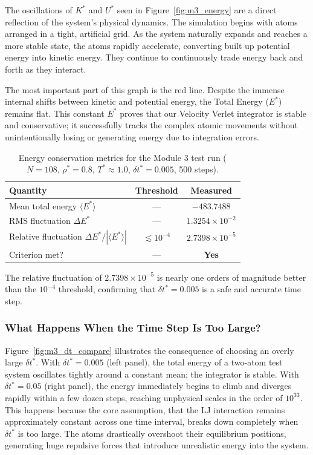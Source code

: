 The oscillations of $K^*$ and $U^*$ seen in Figure~\ref{fig:m3_energy} are a direct reflection of the system's physical dynamics. The simulation begins with atoms arranged in a tight, artificial grid. As the system naturally expands and reaches a more stable state, the atoms rapidly accelerate, converting built up potential energy into kinetic energy. They continue to continuously trade energy back and forth as they interact.

The most important part of this graph is the red line. Despite the immense internal shifts between kinetic and potential energy, the Total Energy ($E^*$) remains flat. This constant $E^*$ proves that our Velocity Verlet integrator is stable and conservative; it successfully tracks the complex atomic movements without unintentionally losing or generating energy due to integration errors.

\begin{table}[H]
    \centering
    \caption{Energy conservation metrics for the Module 3 test run ($N = 108$, $\rho^* = 0.8$, $T^* \approx 1.0$, $\delta t^* = 0.005$, 500 steps).}
    \label{tab:m3_test}
    \begin{tabular}{lcc}
        \toprule
        \textbf{Quantity} & \textbf{Threshold} & \textbf{Measured} \\
        \midrule
        Mean total energy $\langle E^* \rangle$ & --- & $-483.7488$ \\
        RMS fluctuation $\Delta E^*$ & --- & $1.3254 \times 10^{-2}$ \\
        Relative fluctuation $\Delta E^* / |\langle E^* \rangle|$ & $\lesssim 10^{-4}$ & $2.7398 \times 10^{-5}$ \\
        Criterion met? & --- & \textbf{Yes} \\
        \bottomrule
    \end{tabular}
\end{table}
The relative fluctuation of $2.7398 \times 10^{-5}$ is nearly one orders of magnitude better than the $10^{-4}$ threshold, confirming that $\delta t^* = 0.005$ is a safe and accurate time step.

\subsubsection{What Happens When the Time Step Is Too Large?}

Figure~\ref{fig:m3_dt_compare} illustrates the consequence of choosing an overly large $\delta t^*$. With $\delta t^* = 0.005$ (left panel), the total energy of a two-atom test system oscillates tightly around a constant mean; the integrator is stable. With $\delta t^* = 0.05$ (right panel), the energy immediately begins to climb and diverges rapidly within a few dozen steps, reaching unphysical scales in the order of $10^{33}$. This happens because the core assumption, that the LJ interaction remains approximately constant across one time interval, breaks down completely when $\delta t^*$ is too large. The atoms drastically overshoot their equilibrium positions, generating huge repulsive forces that introduce unrealistic energy into the system.

